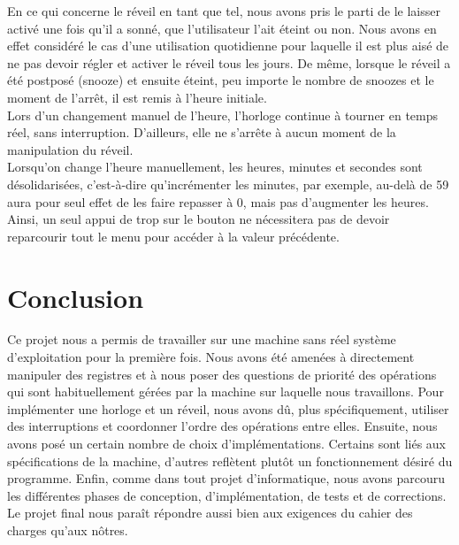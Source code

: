 \documentclass[12pt,a4paper]{article}
\begin{document}
En ce qui concerne le réveil en tant que tel, nous avons pris le parti de le laisser activé une fois qu'il a sonné, que l'utilisateur l'ait éteint ou non. Nous avons en effet considéré le cas d'une utilisation quotidienne pour laquelle il est plus aisé de ne pas devoir régler et activer le réveil tous les jours. De même, lorsque le réveil a été postposé (snooze) et ensuite éteint, peu importe le nombre de snoozes et le moment de l'arrêt, il est remis à l'heure initiale.\\

Lors d'un changement manuel de l'heure, l'horloge continue à tourner en temps réel, sans interruption. D'ailleurs, elle ne s'arrête à aucun moment de la manipulation du réveil.\\

Lorsqu'on change l'heure manuellement, les heures, minutes et secondes sont désolidarisées, c'est-à-dire qu'incrémenter les minutes, par exemple, au-delà de 59 aura pour seul effet de les faire repasser à 0, mais pas d'augmenter les heures. Ainsi, un seul appui de trop sur le bouton ne nécessitera pas de devoir reparcourir tout le menu pour accéder à la valeur précédente.
    
    
\section{Conclusion}

Ce projet nous a permis de travailler sur une machine sans réel système d'exploitation pour la première fois. Nous avons été amenées à directement manipuler des registres et à nous poser des questions de priorité des opérations qui sont habituellement gérées par la machine sur laquelle nous travaillons. Pour implémenter une horloge et un réveil, nous avons dû, plus spécifiquement, utiliser des interruptions et coordonner l'ordre des opérations entre elles. Ensuite, nous avons posé un certain nombre de choix d'implémentations. Certains sont liés aux spécifications de la machine, d'autres reflètent plutôt un fonctionnement désiré du programme. Enfin, comme dans tout projet d'informatique, nous avons parcouru les différentes phases de conception, d'implémentation, de tests et de corrections. Le projet final nous paraît répondre aussi bien aux exigences du cahier des charges qu'aux nôtres.\\


\addto\captionsfrench{\renewcommand{\refname}{bib}}


    
\end{document}
